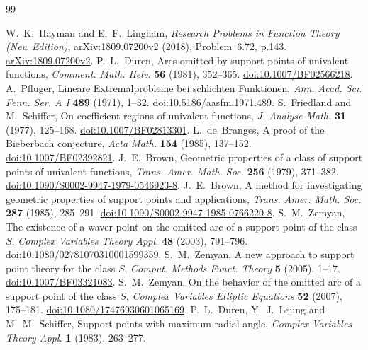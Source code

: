 \documentclass[10pt]{article}
\begin{document}
\begin{thebibliography}{99}
\small\raggedright
\setlength{\itemsep}{0pt}
W.~K.~Hayman and E.~F.~Lingham, \emph{Research Problems in Function
Theory (New Edition)}, arXiv:1809.07200v2 (2018), Problem~6.72, p.143.
\href{https://arxiv.org/abs/1809.07200v2}{arXiv:1809.07200v2}.
P.~L.~Duren, Arcs omitted by support points of univalent functions,
\emph{Comment. Math. Helv.} \textbf{56} (1981), 352--365.
\href{https://doi.org/10.1007/BF02566218}{doi:10.1007/BF02566218}.
A.~Pfluger, Lineare Extremalprobleme bei schlichten Funktionen,
\emph{Ann. Acad. Sci. Fenn. Ser. A I} \textbf{489} (1971), 1--32.
\href{https://doi.org/10.5186/aasfm.1971.489}{doi:10.5186/aasfm.1971.489}.
S.~Friedland and M.~Schiffer, On coefficient regions of univalent
functions, \emph{J. Analyse Math.} \textbf{31} (1977), 125--168.
\href{https://doi.org/10.1007/BF02813301}{doi:10.1007/BF02813301}.
L.~de~Branges, A proof of the Bieberbach conjecture,
\emph{Acta Math.} \textbf{154} (1985), 137--152.
\href{https://doi.org/10.1007/BF02392821}{doi:10.1007/BF02392821}.
J.~E.~Brown, Geometric properties of a class of support points of
univalent functions, \emph{Trans. Amer. Math. Soc.} \textbf{256}
(1979), 371--382.
\href{https://doi.org/10.1090/S0002-9947-1979-0546923-8}{doi:10.1090/S0002-9947-1979-0546923-8}.
J.~E.~Brown, A method for investigating geometric properties of
support points and applications,
\emph{Trans. Amer. Math. Soc.} \textbf{287} (1985), 285--291.
\href{https://doi.org/10.1090/S0002-9947-1985-0766220-8}{doi:10.1090/S0002-9947-1985-0766220-8}.
S.~M.~Zemyan, The existence of a waver point on the omitted arc of
a support point of the class \(S\),
\emph{Complex Variables Theory Appl.} \textbf{48} (2003), 791--796.
\href{https://doi.org/10.1080/02781070310001599359}{doi:10.1080/02781070310001599359}.
S.~M.~Zemyan, A new approach to support point theory for the class
\(S\), \emph{Comput. Methods Funct. Theory} \textbf{5} (2005), 1--17.
\href{https://doi.org/10.1007/BF03321083}{doi:10.1007/BF03321083}.
S.~M.~Zemyan, On the behavior of the omitted arc of a support point
of the class \(S\),
\emph{Complex Variables Elliptic Equations} \textbf{52} (2007), 175--181.
\href{https://doi.org/10.1080/17476930601065169}{doi:10.1080/17476930601065169}.
P.~L.~Duren, Y.~J.~Leung and M.~M.~Schiffer,
Support points with maximum radial angle,
\emph{Complex Variables Theory Appl.} \textbf{1} (1983), 263--277.

\end{thebibliography}
\end{document}
